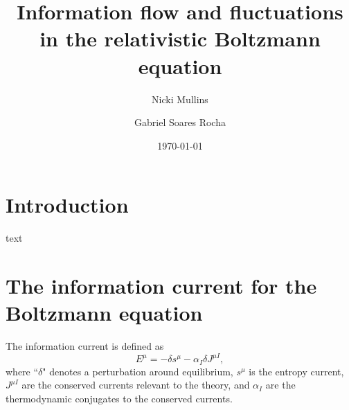 \documentclass[aps,prd,preprint,nofootinbib,amsmath,amssymb,showpacs,longbibliography,singlecolumn,superscriptaddress,10pt]{revtex4-1}
\theoremstyle{plain}
\theoremstyle{definition}
\begin{document}
\title{Information flow and fluctuations in the relativistic Boltzmann equation}
\date{\today}

\author{Nicki Mullins}

\author{Gabriel Soares Rocha}



\begin{abstract}
     
\end{abstract}   



\maketitle

\tableofcontents

\section{Introduction}

text

\section{The information current for the Boltzmann equation}

The information current \cite{Gavassino:2021kjm} is defined as
\begin{equation} \label{Eq:Information_Current}
    E^{\mu} = -\delta s^{\mu} - \alpha_I \delta J^{\mu I} ,
\end{equation}
where ``$\delta$" denotes a perturbation around equilibrium, $s^{\mu}$ is the entropy current, $J^{\mu I}$ are the conserved currents relevant to the theory, and $\alpha_I$ are the thermodynamic conjugates to the conserved currents. 
\end{document}
